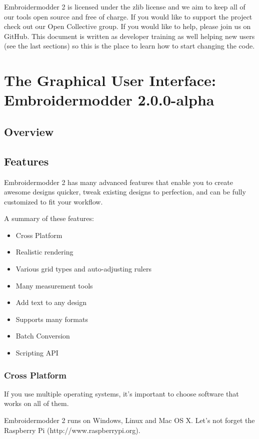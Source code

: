 \documentclass[11pt]{report}
\begin{document}
Embroidermodder 2 is licensed under the zlib license and we aim to keep all of
our tools open source and free of charge. If you would like to support the
project check out our Open Collective group. If you would like to help, please
join us on GitHub. This document is written as developer training as well
helping new users (see the last sections) so this is the place to learn how
to start changing the code.

\chapter{The Graphical User Interface: Embroidermodder 2.0.0-alpha}

\section{Overview}

\section{Features}

Embroidermodder 2 has many advanced features that enable you to create awesome designs quicker, tweak existing designs to perfection, and can be fully customized to fit your workflow.

A summary of these features:

\begin{itemize}
\item Cross Platform
\item Realistic rendering
\item Various grid types and auto-adjusting rulers
\item Many measurement tools
\item Add text to any design
\item Supports many formats
\item Batch Conversion
\item Scripting API
\end{itemize}

\subsection{Cross Platform}

If you use multiple operating systems, it's important to choose software that works on all of them.

Embroidermodder 2 runs on Windows, Linux and Mac OS X. Let's not forget the Raspberry Pi (http://www.raspberrypi.org).
\end{document}
